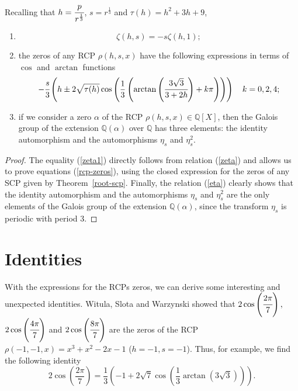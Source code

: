 \documentclass[12pt,reqno]{article}
\begin{document}
\begin{corollary}\label{cor1}
Recalling that $h=\cfrac{p}{r^{\frac{1}{3}}}$, $s=r^{\frac{1}{3}}$ and $\tau(h)=h^2+3h+9$,   
\begin{enumerate}
\item \begin{equation}\label{zeta1} \zeta(h,s)=-s\zeta(h, 1);\end{equation}
\item the zeros of any RCP $\rho(h,s,x)$  have the following expressions in terms of $\cos$ and $\arctan$ functions
\begin{equation}\label{rcp-zeros} -\cfrac{s}{3}\left(h\pm2\sqrt{\tau(h)}\cos\left(\frac{1}{3}\left(\arctan\left(\cfrac{3\sqrt{3}}{3+2h}\right)+k\pi\right)\right)\right)\quad k=0,2,4; \end{equation}
\item if we consider a zero $\alpha$ of the RCP $\rho(h,s,x)\in \mathbb Q[X]$, then the Galois group of the extension $\mathbb Q(\alpha)$ over $\mathbb Q$ has three elements: the identity automorphism and the automorphisms $\eta_s$ and $\eta^2_s$.
\end{enumerate}
\end{corollary}
\begin{proof}
The equality (\ref{zeta1}) directly follows from relation (\ref{zeta}) and allows us to prove 
equations (\ref{rcp-zeros}), using the closed expression for the zeros of any SCP given by Theorem~\ref{root-scp}. Finally, the relation (\ref{eta}) clearly shows that the identity automorphism and the automorphisms $\eta_s$ and $\eta^2_s$ are the only elements of the Galois group of the extension $\mathbb Q(\alpha)$, since the transform $\eta_s$ is periodic with period 3.
\end{proof}

\section{Identities}
With the expressions for the RCPs zeros, we can derive some interesting and unexpected identities. Witula, Slota and Warzynski \cite{quasifib} showed that $2\cos\left(\cfrac{2\pi}{7}\right),$ $2\cos\left(\cfrac{4\pi}{7}\right)$ and $2\cos\left(\cfrac{8\pi}{7}\right)$ are the zeros of the RCP $\rho(-1,-1,x)=x^3+x^2-2x-1$ ($h=-1, s=-1$). Thus, for example, we find the following identity
$$2\cos\left(\frac{2\pi}{7}\right)=\frac{1}{3} \left(-1+2 \sqrt{7} \cos\left(\frac{1}{3} \arctan\left(3 \sqrt{3}\right)\right)\right).$$ 
 
\end{document}
